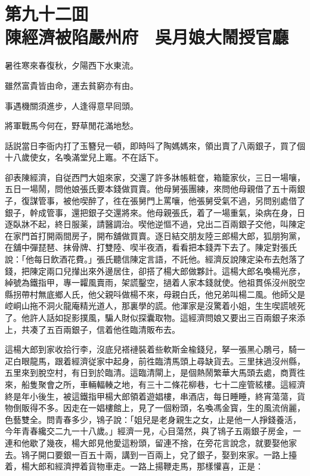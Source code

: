 
\chapter*{第九十二囬　\\陳經濟被陷嚴州府　吳月娘大鬧授官廳}


\begin{myquote}
暑徃寒來春復秋，夕陽西下水東流。

雖然富貴皆由命，運去貧窮亦有由。

事遇機關須進步，人逢得意早囘頭。

將軍戰馬今何在，野草閒花滿地愁。
\end{myquote}

話説當日李衙内打了玉簪兒一頓，即時呌了陶媽媽來，領出賣了八兩銀子，買了個十八歲使女，名喚滿堂兒上竈。不在話下。

卻表陳經濟，自従西門大姐來家，交還了許多牀帳粧奩，箱籠家伙，三日一場嚷，五日一場鬧，問他娘張氏要本錢做買賣。他母舅張團練，來問他母親借了五十兩銀子，復謀管事，被他喫醉了，徃在張舅門上罵嚷，他張舅受氣不過，另問别處借了銀子，幹成管事，還把銀子交還將來。他母親張氏，着了一場重氣，染病在身，日逐臥牀不起，終日服薬，請醫調治。喫他逆慪不過，兌出二百兩銀子交他，叫陳定在家門首打開兩間房子，開布舖做買賣。逐日結交朋友陸三郎楊大郎，狐朋狗黨，在舖中彈琵琶、抹骨牌、打雙陸、喫半夜酒，看看把本錢弄下去了。陳定對張氏說：「他每日飲酒花費。」張氏聽信陳定言語，不託他。經濟反說陳定染布去尅落了錢，把陳定兩口兒攆出來外邊居住，卻搭了楊大郎做夥計。這楊大郎名喚楊光彦，綽號為鐵指甲，專一糶風賣雨，架謊鑿空，撾着人家本錢就使。他祖貫係沒州脱空縣拐帶村無底鄉人氏，他父親呌做楊不來，母親白氏，他兄弟叫楊二風。他師父是崆峒山拖不洞火龍庵精光道人，那裏學的謊。他渾家是沒驚着小姐，生生喫謊唬死了。他許人話如捉影撲風，騙人財似探囊取物。這經濟問娘又要出三百兩銀子來添上，共凑了五百兩銀子，信着他徃臨清販布去。

這楊大郎到家收拾行李，沒底兒褡褳裝着些軟斯金楡錢兒，拏一張黑心鵰弓，騎一疋白眼龍馬，跟着經濟従家中起身，前徃臨清馬頭上尋缺貨去。三里抹過沒州縣，五里來到脫空村，有日到於臨清。這臨清閘上，是個熱鬧繁華大馬頭去處，商賈徃來，船隻聚會之所，車輛輻輳之地，有三十二條花柳巷，七十二座管絃樓。這經濟終是年小後生，被這鐵指甲楊大郎領着遊娼樓，串酒店，每日睡睡，終宵蕩蕩，貨物倒販得不多。因走在一娼樓館上，見了一個粉頭，名喚馮金寳，生的風流俏麗，色藝雙全。問青春多少，鴇子說：「姐兒是老身親生之女，止是他一人掙錢養活，今年青春纔交二九一十八歲。」經濟一見，心目蕩然，與了鴇子五兩銀子房金，一連和他歇了幾夜，楊大郎見他愛這粉頭，留連不捨，在旁花言說念，就要娶他家去。鴇子開口要銀一百五十兩，講到一百兩上，兌了銀子，娶到來家。一路上擡着，楊大郎和經濟押着貨物車走。一路上揚鞭走馬，那樣懽喜，正是：

